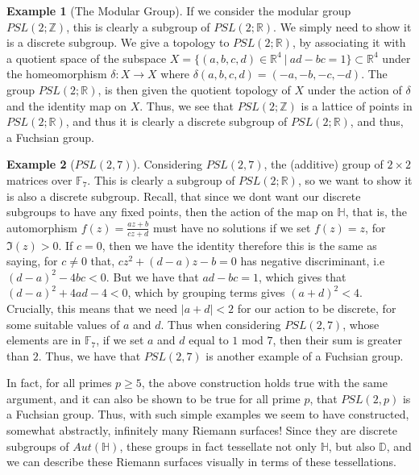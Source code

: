 \documentclass[11pt]{report}
\theoremstyle{definition}
\newtheorem*{example*}{Example}
\begin{document}
\begin{example*}[The Modular Group]
  If we consider the modular group $PSL(2;\mathbb{Z})$, this is clearly a subgroup of $PSL(2;\mathbb{R})$. We simply need to show it is a discrete subgroup. We give a topology to $PSL(2;\mathbb{R})$, by associating it with a quotient space of the subspace $X = \{(a, b, c, d) \in \mathbb{R}^4 \ \vert \ ad-bc=1 \} \subset \mathbb{R}^4$ under the homeomorphism $\delta: X \rightarrow X$ where $\delta(a, b, c, d) = (-a, -b, -c, -d)$. The group $PSL(2;\mathbb{R})$, is then given the quotient topology of $X$ under the action  of $\delta$ and the identity map on $X$. Thus, we see that $PSL(2;\mathbb{Z})$ is a lattice of points in $PSL(2;\mathbb{R})$, and thus it is clearly a discrete subgroup of $PSL(2;\mathbb{R})$, and thus, a Fuchsian group.
\end{example*}
\begin{example*}[$PSL(2,7)$]
  Considering $PSL(2,7)$, the (additive) group of $2\times 2$ matrices over $\mathbb{F}_7$. This is clearly a subgroup of $PSL(2;\mathbb{R})$, so we want to show it is also a discrete subgroup. Recall, that since we dont want our discrete subgroups to have any fixed points, then the action of the map on $\mathbb{H}$, that is, the automorphism $f(z)=\frac{az+b}{cz+d}$ must have no solutions if we set $f(z)=z$, for $\Im(z) > 0$. If $c = 0$, then we have the identity therefore this is the same as saying, for $c \neq 0$ that, $cz^2 + (d-a)z - b = 0$ has negative discriminant, i.e $(d-a)^2 - 4bc < 0$. But we have that $ad-bc = 1$, which gives that $(d-a)^2 +4ad -4 < 0$, which by grouping terms gives $(a + d)^2 < 4$. Crucially, this means that we need $\vert a + d \vert < 2$ for our action to be discrete, for some suitable values of $a$ and $d$. Thus when considering $PSL(2,7)$, whose elements are in $\mathbb{F}_7$, if we set $a$ and $d$ equal to $1$ mod $7$, then their sum is greater than $2$. Thus, we have that $PSL(2,7)$ is another example of a Fuchsian group.
\end{example*}
In fact, for all primes $p \geq 5$, the above construction holds true with the same argument, and it can also be shown to be true for all prime $p$, that $PSL(2,p)$ is a Fuchsian group. Thus, with such simple examples we seem to have constructed, somewhat abstractly, infinitely many Riemann surfaces! Since they are discrete subgroups of $Aut(\mathbb{H})$, these groups in fact tessellate not only $\mathbb{H}$, but also $\mathbb{D}$, and we can describe these Riemann surfaces visually in terms of these tessellations.
\end{document}
